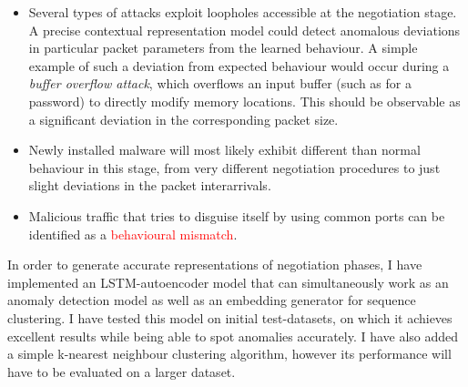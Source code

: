 \documentclass[a4paper,12pt,twoside]{article}
\begin{document}
\begin{itemize}
\item Several types of attacks exploit loopholes accessible at the negotiation stage. A precise contextual representation model could detect anomalous deviations in particular packet parameters from the learned behaviour. A simple example of such a deviation from expected behaviour would occur during a \textit{buffer overflow attack}, which overflows an input buffer (such as for a password) to directly modify memory locations. This should be observable as a significant deviation in the corresponding packet size.

\item Newly installed malware will most likely exhibit different than normal behaviour in this stage, from very different negotiation procedures to just slight deviations in the packet interarrivals.


\item Malicious traffic that tries to disguise itself by using common ports can be identified as a \textcolor{red}{behavioural mismatch}.


\end{itemize}

In order to generate accurate representations of negotiation phases, I have implemented an LSTM-autoencoder model that can simultaneously work as an anomaly detection model as well as an embedding generator for sequence clustering. I have tested this model on initial test-datasets, on which it achieves excellent results while being able to spot anomalies accurately. I have also added a simple k-nearest neighbour clustering algorithm, however its performance will have to be evaluated on a larger dataset. 
\end{document}
